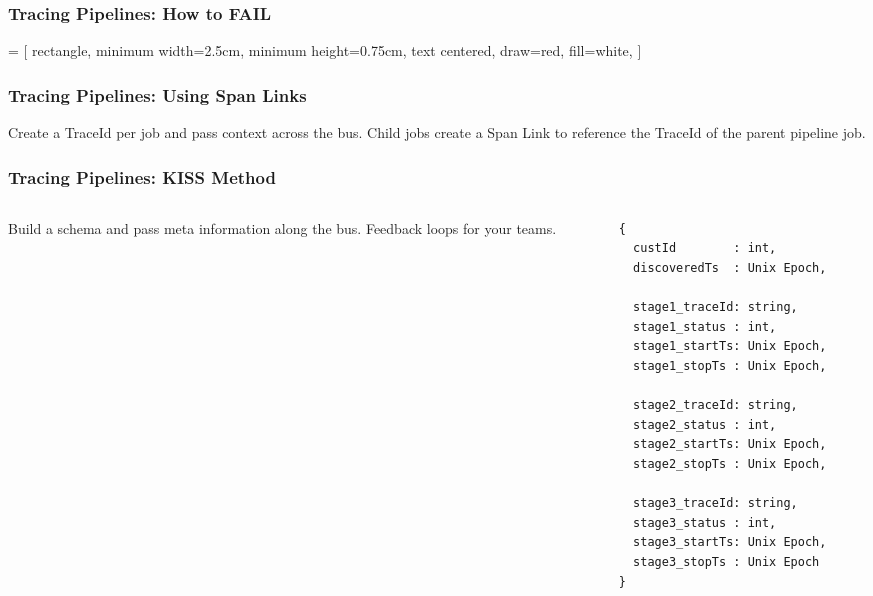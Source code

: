 \begin{frame}
    \frametitle{Tracing Pipelines: How to FAIL}
    \centering
\end{frame}

 = [
    rectangle,
    minimum width=2.5cm, 
    minimum height=0.75cm,
    text centered, 
    draw=red, 
    fill=white,
]
\begin{frame}
    \frametitle{Tracing Pipelines: Using Span Links}
    \centering
    \raggedright

    Create a TraceId per job and pass context across the bus.  Child jobs
    create a Span Link to reference the TraceId of the parent pipeline job.
\end{frame}

\begin{frame}[fragile]
    \frametitle{Tracing Pipelines: KISS Method}

    \begin{columns}
        \begin{column}{0.5\textwidth}
            Build a schema and pass meta information along the bus.
            \vskip 0.5cm
            Feedback loops for your teams.
        \end{column}
        \begin{column}{0.5\textwidth}
    \begin{figure}[h!]
        \begin{lstlisting}[linewidth=4cm]
{
  custId        : int,
  discoveredTs  : Unix Epoch,

  stage1_traceId: string,
  stage1_status : int,
  stage1_startTs: Unix Epoch,
  stage1_stopTs : Unix Epoch,

  stage2_traceId: string,
  stage2_status : int,
  stage2_startTs: Unix Epoch,
  stage2_stopTs : Unix Epoch,

  stage3_traceId: string,
  stage3_status : int,
  stage3_startTs: Unix Epoch,
  stage3_stopTs : Unix Epoch
}
        \end{lstlisting}
    \end{figure}
        \end{column}
    \end{columns}
\end{frame}
